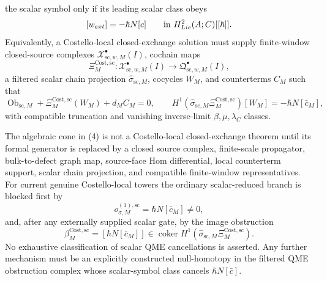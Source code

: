 \documentclass[11pt]{memoir}
\begin{document}
\begin{thm}
\begin{enumerate}
      the scalar symbol only if its leading scalar class obeys
      \[
        [w_{ext}]=-\hbar N[c]
        \qquad\text{in }H^2_{Lie}(A;C)[[\hbar]].
      \]
      Equivalently, a Costello-local closed-exchange solution must supply
      finite-window closed-source complexes
      \(\mathcal X^\bullet_{\mathrm{sc},w,M}(I)\), cochain maps
      \[
        \Xi^{\mathrm{Cost},\mathrm{sc}}_M\colon
        \mathcal X^\bullet_{\mathrm{sc},w,M}(I)\to
        \mathfrak Q^\bullet_{\mathrm{sc},w,M}(I),
      \]
      a filtered scalar chain projection
      \(\widehat\sigma_{\mathrm{sc},M}\), cocycles \(W_M\), and
      counterterms \(C_M\) such that
      \[
        \operatorname{Ob}_{\mathrm{sc},M}
        +\Xi^{\mathrm{Cost},\mathrm{sc}}_M(W_M)+d_MC_M=0,
        \qquad
        H^1(\widehat\sigma_{\mathrm{sc},M}
        \Xi^{\mathrm{Cost},\mathrm{sc}}_M)[W_M]
        =
        -\hbar N[\bar c_M],
      \]
      with compatible truncation and vanishing inverse-limit
      \(\beta,\mu,\lambda_C\) classes.
  \end{enumerate}
  The algebraic cone in (4) is not a Costello-local closed-exchange
  theorem until its formal generator is replaced by a closed source
  complex, finite-scale propagator, bulk-to-defect graph map, source-face
  Hom differential, local counterterm support, scalar chain projection,
  and compatible finite-window representatives.  For current genuine
  Costello-local towers the ordinary scalar-reduced branch is blocked first
  by
  \[
    o_{\sigma,M}^{(1),\mathrm{sc}}=\hbar N[\bar c_M]\ne0,
  \]
  and, after any externally supplied scalar gate, by the image obstruction
  \[
    \beta_M^{\mathrm{Cost},\mathrm{sc}}
    =
    [\hbar N[\bar c_M]]
    \in
    \operatorname{coker}
    H^1(\widehat\sigma_{\mathrm{sc},M}
    \Xi^{\mathrm{Cost},\mathrm{sc}}_M).
  \]
  No exhaustive classification of scalar QME cancellations is asserted.
  Any further mechanism must be an explicitly constructed null-homotopy in
  the filtered QME obstruction complex whose scalar-symbol class cancels
  \(\hbar N[\bar c]\).
\end{thm}
\end{document}
